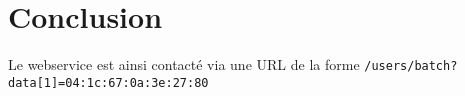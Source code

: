 \chapter*{Conclusion}

Le webservice est ainsi contacté via une URL de la forme \verb|/users/batch?data[1]=04:1c:67:0a:3e:27:80|

